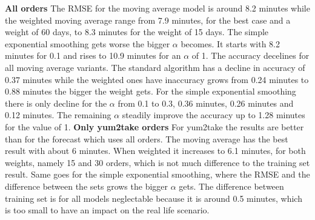 \newline\newline\textbf{All orders}\newline
The RMSE for the moving average model is around 8.2 minutes while the weighted moving average range from 7.9 minutes, for the best case and a weight of 60 days, to 8.3 minutes for the weight of 15 days. The simple exponential smoothing gets worse the bigger $\alpha$ becomes. It starts with 8.2 minutes for 0.1 and rises to 10.9 minutes for an $\alpha$ of 1. The accuracy decelines for all moving average variants. The standard algorithm has a decline in accuracy of 0.37 minutes while the weighted ones have inaccuracy grows from 0.24 minutes to 0.88 minutes the bigger the weight gets. For the simple exponential smoothing there is only decline for the $\alpha$ from 0.1 to 0.3, 0.36 minutes, 0.26 minutes and 0.12 minutes. The remaining $\alpha$ steadily improve the accuracy up to 1.28 minutes for the value of 1.
\newline\newline\textbf{Only yum2take orders}\newline
For yum2take the results are better than for the forecast which uses all orders. The moving average has the best result with about 6 minutes. When weighted it increases to 6.1 minutes, for both weights, namely 15 and 30 orders, which is not much difference to the training set result. Same goes for the simple exponential smoothing, where the RMSE and the difference between the sets grows the bigger $\alpha$ gets. The difference between training set is for all models neglectable because it is around 0.5 minutes, which is too small to have an impact on the real life scenario.
